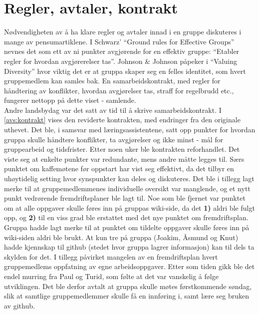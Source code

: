 \section{Regler, avtaler, kontrakt}
\label{sec:kontrakt}
Nødvendigheten av å ha klare regler og avtaler innad i en gruppe diskuteres i
mange av pensumartiklene. I Schwarz' ``Ground rules for Effective Groups''
\cite{schwarz} nevnes det som ett av ni punkter avgjørende for en effektiv
gruppe: ``Etabler regler for hvordan avgjørerelser
tas''. Johnson \& Johnson påpeker i ``Valuing Diversity'' \cite{jj} hvor viktig det er at gruppa skaper seg en felles
identitet, som hvert gruppemedlem kan samles bak. En samarbeidskontrakt, med
regler for håndtering av konflikter, hvordan avgjørelser tas, straff for
regelbrudd etc., fungerer nettopp på dette viset -
samlende. \\

Andre landsbydag var det satt av tid til å skrive samarbeidskontrakt. 
I \cref{avs:kontrakt} vises den reviderte kontrakten, med endringer fra den
originale uthevet. Det ble, i
samsvar med læringsassistentene, satt opp punkter for hvordan gruppa skulle
håndtere konflikter, ta avgjørelser og ikke minst - mål for gruppearbeid og
tidsfrister. Etter noen uker ble kontrakten reforhandlet. Det viste seg at
enkelte punkter var redundante, mens andre måtte legges til. Særs punktet om
kaffemøtene før oppstart har vist seg effektivt, da det tilbyr en uhøytidelig
setting hvor synspunkter kan deles og diskuteres. Det ble i
tillegg lagt merke til at gruppemedlemmenes individuelle oversikt var manglende, og et nytt
punkt vedrørende fremdriftsplaner ble lagt til. Noe som ble fjernet var punktet
om at alle oppgaver skulle føres inn på gruppas wiki-side, da det \textbf{1)} aldri ble
fulgt opp, og \textbf{2)} til en viss grad ble erstattet med det nye punktet om
fremdriftsplan. \\

Gruppa hadde lagt merke til at punktet om tildelte oppgaver skulle føres
inn på wiki-siden aldri ble brukt. At kun tre på gruppa (Joakim, Åsmund og Knut)
hadde kjennskap til github (stedet hvor gruppa lagrer informasjon) kan til dels
ta skylden for det. I tillegg påvirket mangelen av en fremdriftsplan hvert
gruppemedlems oppfatning av egne arbeidsoppgaver. Etter som tiden gikk ble det
endel murring fra Paul og Turid, som følte at det var vanskelig
å følge utviklingen. Det ble derfor avtalt at gruppa skulle møtes førstkommende
søndag, slik at samtlige gruppemedlemmer skulle få en innføring i, samt lære seg
bruken av github. \\

